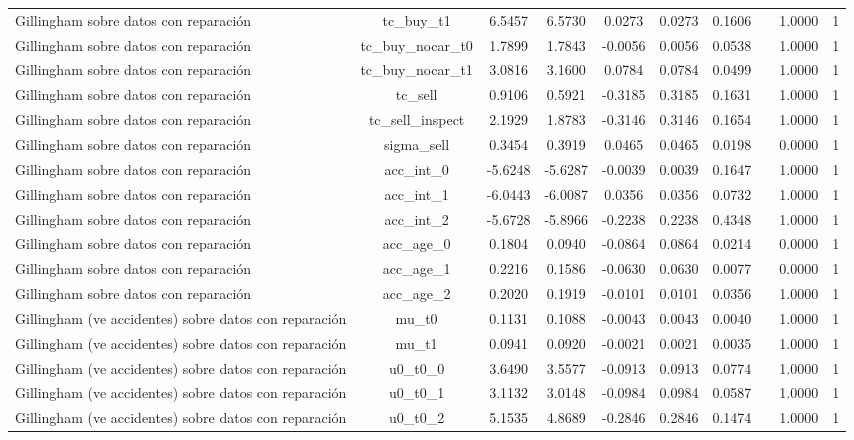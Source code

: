 \begin{table}[htbp]
\begin{tabular}{lccccccccc}
Gillingham sobre datos con reparación & tc\_buy\_t1 & 6.5457 & 6.5730 & 0.0273 & 0.0273 & 0.1606 &  & 1.0000 & 1 \\
Gillingham sobre datos con reparación & tc\_buy\_nocar\_t0 & 1.7899 & 1.7843 & -0.0056 & 0.0056 & 0.0538 &  & 1.0000 & 1 \\
Gillingham sobre datos con reparación & tc\_buy\_nocar\_t1 & 3.0816 & 3.1600 & 0.0784 & 0.0784 & 0.0499 &  & 1.0000 & 1 \\
Gillingham sobre datos con reparación & tc\_sell & 0.9106 & 0.5921 & -0.3185 & 0.3185 & 0.1631 &  & 1.0000 & 1 \\
Gillingham sobre datos con reparación & tc\_sell\_inspect & 2.1929 & 1.8783 & -0.3146 & 0.3146 & 0.1654 &  & 1.0000 & 1 \\
Gillingham sobre datos con reparación & sigma\_sell & 0.3454 & 0.3919 & 0.0465 & 0.0465 & 0.0198 &  & 0.0000 & 1 \\
Gillingham sobre datos con reparación & acc\_int\_0 & -5.6248 & -5.6287 & -0.0039 & 0.0039 & 0.1647 &  & 1.0000 & 1 \\
Gillingham sobre datos con reparación & acc\_int\_1 & -6.0443 & -6.0087 & 0.0356 & 0.0356 & 0.0732 &  & 1.0000 & 1 \\
Gillingham sobre datos con reparación & acc\_int\_2 & -5.6728 & -5.8966 & -0.2238 & 0.2238 & 0.4348 &  & 1.0000 & 1 \\
Gillingham sobre datos con reparación & acc\_age\_0 & 0.1804 & 0.0940 & -0.0864 & 0.0864 & 0.0214 &  & 0.0000 & 1 \\
Gillingham sobre datos con reparación & acc\_age\_1 & 0.2216 & 0.1586 & -0.0630 & 0.0630 & 0.0077 &  & 0.0000 & 1 \\
Gillingham sobre datos con reparación & acc\_age\_2 & 0.2020 & 0.1919 & -0.0101 & 0.0101 & 0.0356 &  & 1.0000 & 1 \\
Gillingham (ve accidentes) sobre datos con reparación & mu\_t0 & 0.1131 & 0.1088 & -0.0043 & 0.0043 & 0.0040 &  & 1.0000 & 1 \\
Gillingham (ve accidentes) sobre datos con reparación & mu\_t1 & 0.0941 & 0.0920 & -0.0021 & 0.0021 & 0.0035 &  & 1.0000 & 1 \\
Gillingham (ve accidentes) sobre datos con reparación & u0\_t0\_0 & 3.6490 & 3.5577 & -0.0913 & 0.0913 & 0.0774 &  & 1.0000 & 1 \\
Gillingham (ve accidentes) sobre datos con reparación & u0\_t0\_1 & 3.1132 & 3.0148 & -0.0984 & 0.0984 & 0.0587 &  & 1.0000 & 1 \\
Gillingham (ve accidentes) sobre datos con reparación & u0\_t0\_2 & 5.1535 & 4.8689 & -0.2846 & 0.2846 & 0.1474 &  & 1.0000 & 1 \\

\end{tabular}
\end{table}
